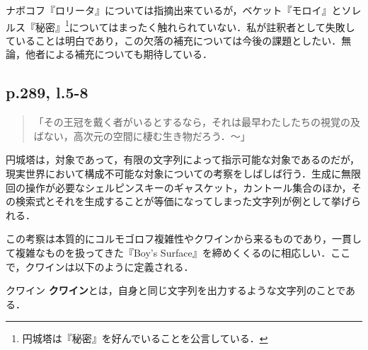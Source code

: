 \documentclass[10pt, a5paper, twoside]{ltjsarticle}
\begin{document}
            ナボコフ『ロリータ』については指摘出来ているが，ベケット『モロイ』\cite{beckett}とソレルス『秘密』\footnote{円城塔は『秘密』を好んでいることを公言している\cite{sfm}．}\cite{sollers}についてはまったく触れられていない．私が註釈者として失敗していることは明白であり，この欠落の補充については今後の課題としたい．無論，他者による補充についても期待している．

        \subsection{p.289, l.5-8}

            \begin{quote}
                「その王冠を戴く者がいるとするなら，それは最早わたしたちの視覚の及ばない，高次元の空間に棲む生き物だろう．〜」
            \end{quote}

            円城塔は，対象であって，有限の文字列によって指示可能な対象であるのだが，現実世界において構成不可能な対象についての考察をしばしば行う．生成に無限回の操作が必要なシェルピンスキーのギャスケット，カントール集合のほか，その検索式とそれを生成することが等価になってしまった文字列が例として挙げられる．

            この考察は本質的にコルモゴロフ複雑性やクワインから来るものであり，一貫して複雑なものを扱ってきた『Boy's Surface』を締めくくるのに相応しい．ここで，クワインは以下のように定義される．

            \begin{dfn}{クワイン}{}
                \textbf{クワイン}とは，自身と同じ文字列を出力するような文字列のことである．
            \end{dfn}
\end{document}

